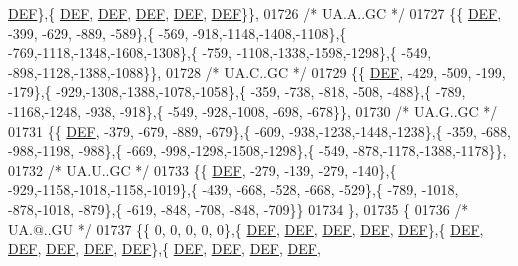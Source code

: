 \begin{DoxyCode}
      \mbox{\hyperlink{1_88_84__epars_8h_a397419fc12b37ed479c8abb9d444d843}{DEF}}\},\{  \mbox{\hyperlink{1_88_84__epars_8h_a397419fc12b37ed479c8abb9d444d843}{DEF}},  \mbox{\hyperlink{1_88_84__epars_8h_a397419fc12b37ed479c8abb9d444d843}{DEF}},  \mbox{\hyperlink{1_88_84__epars_8h_a397419fc12b37ed479c8abb9d444d843}{DEF}},  \mbox{\hyperlink{1_88_84__epars_8h_a397419fc12b37ed479c8abb9d444d843}{DEF}},  \mbox{\hyperlink{1_88_84__epars_8h_a397419fc12b37ed479c8abb9d444d843}{DEF}}\}\},
01726 \textcolor{comment}{/* UA.A..GC */}
01727 \{\{  \mbox{\hyperlink{1_88_84__epars_8h_a397419fc12b37ed479c8abb9d444d843}{DEF}}, -399, -629, -889, -589\},\{ -569, -918,-1148,-1408,-1108\},\{ -769,-1118,-1348,-1608,-1308\},\{ -759,
      -1108,-1338,-1598,-1298\},\{ -549, -898,-1128,-1388,-1088\}\},
01728 \textcolor{comment}{/* UA.C..GC */}
01729 \{\{  \mbox{\hyperlink{1_88_84__epars_8h_a397419fc12b37ed479c8abb9d444d843}{DEF}}, -429, -509, -199, -179\},\{ -929,-1308,-1388,-1078,-1058\},\{ -359, -738, -818, -508, -488\},\{ -789,
      -1168,-1248, -938, -918\},\{ -549, -928,-1008, -698, -678\}\},
01730 \textcolor{comment}{/* UA.G..GC */}
01731 \{\{  \mbox{\hyperlink{1_88_84__epars_8h_a397419fc12b37ed479c8abb9d444d843}{DEF}}, -379, -679, -889, -679\},\{ -609, -938,-1238,-1448,-1238\},\{ -359, -688, -988,-1198, -988\},\{ -669,
       -998,-1298,-1508,-1298\},\{ -549, -878,-1178,-1388,-1178\}\},
01732 \textcolor{comment}{/* UA.U..GC */}
01733 \{\{  \mbox{\hyperlink{1_88_84__epars_8h_a397419fc12b37ed479c8abb9d444d843}{DEF}}, -279, -139, -279, -140\},\{ -929,-1158,-1018,-1158,-1019\},\{ -439, -668, -528, -668, -529\},\{ -789,
      -1018, -878,-1018, -879\},\{ -619, -848, -708, -848, -709\}\}
01734 \},
01735 \{
01736 \textcolor{comment}{/* UA.@..GU */}
01737 \{\{    0,    0,    0,    0,    0\},\{  \mbox{\hyperlink{1_88_84__epars_8h_a397419fc12b37ed479c8abb9d444d843}{DEF}},  \mbox{\hyperlink{1_88_84__epars_8h_a397419fc12b37ed479c8abb9d444d843}{DEF}},  \mbox{\hyperlink{1_88_84__epars_8h_a397419fc12b37ed479c8abb9d444d843}{DEF}},  \mbox{\hyperlink{1_88_84__epars_8h_a397419fc12b37ed479c8abb9d444d843}{DEF}},  \mbox{\hyperlink{1_88_84__epars_8h_a397419fc12b37ed479c8abb9d444d843}{DEF}}\},\{  
      \mbox{\hyperlink{1_88_84__epars_8h_a397419fc12b37ed479c8abb9d444d843}{DEF}},  \mbox{\hyperlink{1_88_84__epars_8h_a397419fc12b37ed479c8abb9d444d843}{DEF}},  \mbox{\hyperlink{1_88_84__epars_8h_a397419fc12b37ed479c8abb9d444d843}{DEF}},  \mbox{\hyperlink{1_88_84__epars_8h_a397419fc12b37ed479c8abb9d444d843}{DEF}},  \mbox{\hyperlink{1_88_84__epars_8h_a397419fc12b37ed479c8abb9d444d843}{DEF}}\},\{  \mbox{\hyperlink{1_88_84__epars_8h_a397419fc12b37ed479c8abb9d444d843}{DEF}},  \mbox{\hyperlink{1_88_84__epars_8h_a397419fc12b37ed479c8abb9d444d843}{DEF}},  \mbox{\hyperlink{1_88_84__epars_8h_a397419fc12b37ed479c8abb9d444d843}{DEF}},  \mbox{\hyperlink{1_88_84__epars_8h_a397419fc12b37ed479c8abb9d444d843}{DEF}},  

\end{DoxyCode}
